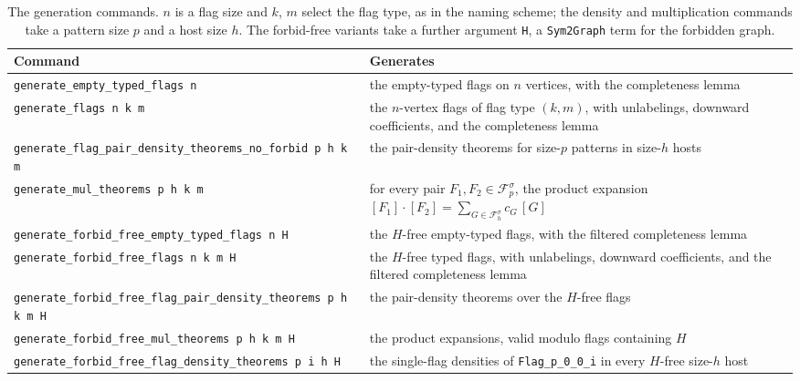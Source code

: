 \documentclass{article}
\newcommand{\lean}[1]{\texttt{#1}}
\begin{document}
\begin{table}
  \centering
  \caption{The generation commands.  \(n\) is a flag size and \(k\), \(m\)
  select the flag type, as in the naming scheme; the density and
  multiplication commands take a pattern size \(p\) and a host size \(h\).
  The forbid-free variants take a further argument \lean{H}, a
  \lean{Sym2Graph} term for the forbidden graph.}
  \label{tab:generation-commands}
  \small
  \begin{tabular}{@{}lp{}@{}}
    \toprule
    Command & Generates \\
    \midrule
    \lean{generate\_empty\_typed\_flags n} &
      the empty-typed flags on \(n\) vertices, with the completeness lemma \\
    \lean{generate\_flags n k m} &
      the \(n\)-vertex flags of flag type \((k,m)\), with unlabelings, downward
      coefficients, and the completeness lemma \\
    \lean{generate\_flag\_pair\_density\_theorems\_no\_forbid p h k m} &
      the pair-density theorems for size-\(p\) patterns in size-\(h\) hosts \\
    \lean{generate\_mul\_theorems p h k m} &
      for every pair \(F_1,F_2\in\mathcal F^\sigma_p\), the product expansion
      \([F_1]\cdot[F_2]=\sum_{G\in\mathcal F^\sigma_h} c_G\,[G]\) \\
    \midrule
    \lean{generate\_forbid\_free\_empty\_typed\_flags n H} &
      the \(H\)-free empty-typed flags, with the filtered completeness lemma \\
    \lean{generate\_forbid\_free\_flags n k m H} &
      the \(H\)-free typed flags, with unlabelings, downward coefficients,
      and the filtered completeness lemma \\
    \lean{generate\_forbid\_free\_flag\_pair\_density\_theorems p h k m H} &
      the pair-density theorems over the \(H\)-free flags \\
    \lean{generate\_forbid\_free\_mul\_theorems p h k m H} &
      the product expansions, valid modulo flags containing \(H\) \\
    \lean{generate\_forbid\_free\_flag\_density\_theorems p i h H} &
      the single-flag densities of \lean{Flag\_p\_0\_0\_i} in every
      \(H\)-free size-\(h\) host \\
    \bottomrule
  \end{tabular}
\end{table}
\end{document}
